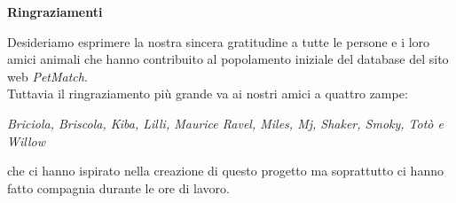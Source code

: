 \begin{center}
    \Large\textbf{Ringraziamenti}
\end{center}
Desideriamo esprimere la nostra sincera gratitudine a tutte le persone e i loro amici animali che hanno contribuito al popolamento iniziale del database del sito web \textit{PetMatch}.\\
Tuttavia il ringraziamento più grande va ai nostri amici a quattro zampe:
\begin{center}
\textit{Briciola, Briscola, Kiba, Lilli, Maurice Ravel, Miles, Mj, Shaker, Smoky, Totò e Willow}
\end{center}
che ci hanno ispirato nella creazione di questo progetto ma soprattutto ci hanno fatto compagnia durante le ore di lavoro.\\